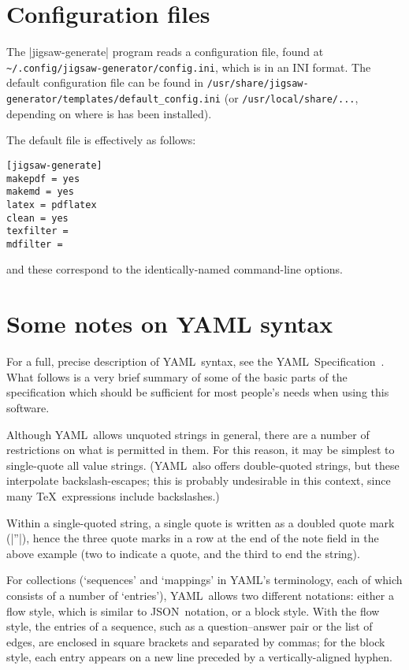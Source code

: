 \documentclass{article}
\def\YAML{{\small YAML}}
\def\JSON{{\small JSON}}
\begin{document}
\section{Configuration files}

The |jigsaw-generate| program reads a configuration file, found at
\nolinkurl{~/.config/jigsaw-generator/config.ini}, which is in an
{\small INI} format.  The default configuration file can be found in
\nolinkurl{/usr/share/jigsaw-generator/templates/default_config.ini}
(or \nolinkurl{/usr/local/share/...}, depending on where is has been
installed).

The default file is effectively as follows:

\begin{verbatim}
[jigsaw-generate]
makepdf = yes
makemd = yes
latex = pdflatex
clean = yes
texfilter = 
mdfilter = 
\end{verbatim}

and these correspond to the identically-named command-line options.

\section{Some notes on \texorpdfstring{\YAML}{YAML} syntax}

For a full, precise description of \YAML\ syntax, see the \YAML\
Specification~\cite{YAML}.  What follows is a very brief summary of
some of the basic parts of the specification which should be
sufficient for most people's needs when using this software.

Although \YAML\ allows unquoted strings in general, there are a number
of restrictions on what is permitted in them.  For this reason, it may
be simplest to single-quote all value strings.  (\YAML\ also offers
double-quoted strings, but these interpolate backslash-escapes; this
is probably undesirable in this context, since many \TeX\ expressions
include backslashes.)

Within a single-quoted string, a single quote is written as a doubled
quote mark (|''|), hence the three quote marks in a row at the
end of the note field in the above example (two to indicate a quote,
and the third to end the string).

For collections (`sequences' and `mappings' in \YAML's terminology,
each of which consists of a number of `entries'), \YAML\ allows two
different notations: either a flow style, which is similar to \JSON\
notation, or a block style.  With the flow style, the entries of a
sequence, such as a question--answer pair or the list of edges,
are enclosed in square brackets and separated by commas; for the block
style, each entry appears on a new line preceded by a
vertically-aligned hyphen.
\end{document}
